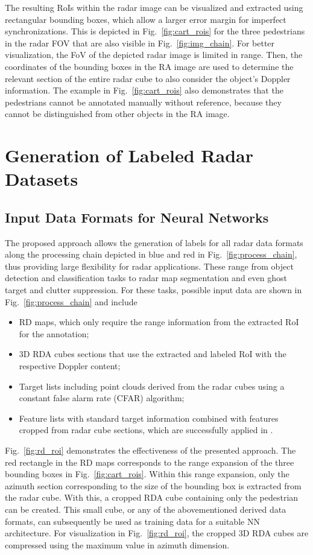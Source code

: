 \documentclass[conference]{IEEEtran}
\begin{document}
The resulting RoIs within the radar image can be visualized and extracted using rectangular bounding boxes, which allow a larger error margin for imperfect synchronizations.
This is depicted in Fig.~\ref{fig:cart_rois} for the three pedestrians in the radar FOV that are also visible in Fig.~\ref{fig:img_chain}.
For better visualization, the FoV of the depicted radar image is limited in range.
Then, the coordinates of the bounding boxes in the RA image are used to determine the relevant section of the entire radar cube to also consider the object's Doppler information.
The example in Fig.~\ref{fig:cart_rois} also demonstrates that the pedestrians cannot be annotated manually without reference, because they cannot be distinguished from other objects in the RA image.

%
%
%
\section{Generation of Labeled Radar Datasets}

\subsection{Input Data Formats for Neural Networks}

The proposed approach allows the generation of labels for all radar data formats along the processing chain depicted in blue and red in Fig.~\ref{fig:process_chain}, thus providing large flexibility for radar applications.
These range from object detection and classification tasks to radar map segmentation and even ghost target and clutter suppression.
For these tasks, possible input data are shown in Fig.~\ref{fig:process_chain} and include
\begin{itemize}
    \item RD maps, which only require the range information from the extracted RoI for the annotation;
    \item 3D RDA cubes sections that use the extracted and labeled RoI with the respective Doppler content;
    \item Target lists including point clouds derived from the radar cubes using a constant false alarm rate (CFAR) algorithm;
    \item Feature lists with standard target information combined with features cropped from radar cube sections, which are successfully applied in \cite{b20}.
\end{itemize}

Fig.~\ref{fig:rd_roi} demonstrates the effectiveness of the presented approach.
The red rectangle in the RD maps corresponds to the range expansion of the three bounding boxes in Fig.~\ref{fig:cart_rois}.
Within this range expansion, only the azimuth section corresponding to the size of the bounding box is extracted from the radar cube.
With this, a cropped RDA cube containing only the pedestrian can be created.
This small cube, or any of the abovementioned derived data formats, can subsequently be used as training data for a suitable NN architecture.
For visualization in Fig.~\ref{fig:rd_roi}, the cropped 3D RDA cubes are compressed using the maximum value in azimuth dimension.
\end{document}
